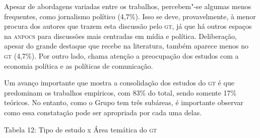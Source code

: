 Apesar de abordagens variadas entre os trabalhos, percebem"-se algumas
menos frequentes, como jornalismo político (4,7\%). Isso se deve,
provavelmente, à menor procura dos autores que trazem esta
discussão pelo \textsc{gt}, já que há outros espaços na \textsc{anpocs} para discussões
mais centradas em mídia e política. Deliberação, apesar do grande
destaque que recebe na literatura, também aparece menos no \textsc{gt} (4,7\%).
Por outro lado, chama atenção a preocupação dos estudos com a economia
política e as políticas de comunicação.

Um avanço importante que mostra a consolidação dos estudos do \textsc{gt} é que
predominam os trabalhos empíricos, com 83\% do total, sendo somente 17\%
teóricos. No entanto, como o Grupo tem três subáreas, é importante
observar como essa constatação pode ser apropriada por cada uma delas.

\begin{center}
Tabela 12: Tipo de estudo x Área temática do \textsc{gt}
\end{center}


